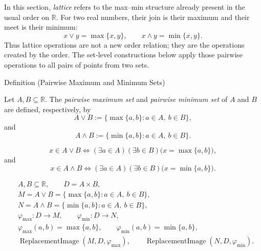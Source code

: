 \begin{remark*}[Orientation]
In this section, \emph{lattice} refers to the max--min structure already
present in the usual order on $\mathbb{R}$.  For two real numbers, their
join is their maximum and their meet is their minimum:
\[
  x\vee y=\max\{x,y\},
  \qquad
  x\wedge y=\min\{x,y\}.
\]
Thus lattice operations are not a new order relation; they are the operations
created by the order.  The set-level constructions below apply those pairwise
operations to all pairs of points from two sets.
\end{remark*}

\begin{definitionbox}{Definition (Pairwise Maximum and Minimum Sets)}
\begin{definition}
\label{def:pairwise-maximum-minimum-sets}
Let $A,B\subseteq\mathbb{R}$.  The \emph{pairwise maximum set} and
\emph{pairwise minimum set} of $A$ and $B$ are defined, respectively, by
\[
  A\vee B:=\{\max\{a,b\}:a\in A,\ b\in B\},
\]
and
\[
  A\wedge B:=\{\min\{a,b\}:a\in A,\ b\in B\}.
\]
\end{definition}
\end{definitionbox}

\begin{remark*}
\[
x\in A\vee B
\Longleftrightarrow
(\exists a\in A)(\exists b\in B)\bigl(x=\max\{a,b\}\bigr),
\]
and
\[
x\in A\wedge B
\Longleftrightarrow
(\exists a\in A)(\exists b\in B)\bigl(x=\min\{a,b\}\bigr).
\]
\end{remark*}

\begin{remark*}
\[
\begin{aligned}
&A,B\subseteq\mathbb{R},\qquad D=A\times B,\\
&M=A\vee B=\{\max\{a,b\}:a\in A,\ b\in B\},\\
&N=A\wedge B=\{\min\{a,b\}:a\in A,\ b\in B\},\\
&\varphi_{\max}\colon D\to M,\qquad \varphi_{\min}\colon D\to N,\\
&\varphi_{\max}(a,b)=\max\{a,b\},\qquad
\varphi_{\min}(a,b)=\min\{a,b\},\\
&\operatorname{ReplacementImage}(M,D,\varphi_{\max}),\qquad
\operatorname{ReplacementImage}(N,D,\varphi_{\min}).
\end{aligned}
\]
\end{remark*}

